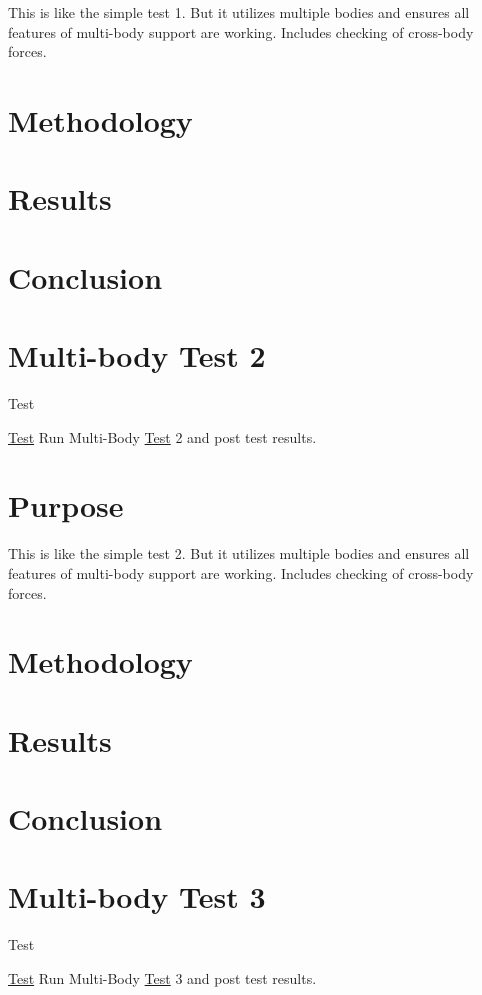 This is like the simple test 1. But it utilizes multiple bodies and ensures all features of multi-\/body support are working. Includes checking of cross-\/body forces.

\section*{Methodology}

\section*{Results}

\section*{Conclusion}\hypertarget{MultiBodyTest2}{}\section{Multi-\/body Test 2}\label{MultiBodyTest2}
\begin{DoxyRefDesc}{Test}
\item[\hyperlink{test__test000002}{Test}]Run Multi-\/\-Body \hyperlink{class_test}{Test} 2 and post test results.\end{DoxyRefDesc}


\section*{Purpose}

This is like the simple test 2. But it utilizes multiple bodies and ensures all features of multi-\/body support are working. Includes checking of cross-\/body forces.

\section*{Methodology}

\section*{Results}

\section*{Conclusion}\hypertarget{MultiBodyTest3}{}\section{Multi-\/body Test 3}\label{MultiBodyTest3}
\begin{DoxyRefDesc}{Test}
\item[\hyperlink{test__test000003}{Test}]Run Multi-\/\-Body \hyperlink{class_test}{Test} 3 and post test results.\end{DoxyRefDesc}



